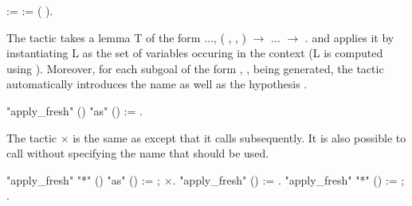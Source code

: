 \documentclass[12pt]{report}
\begin{document}
\begin{coqdoccode}
\coqdocemptyline
\coqdocnoindent
{}   :=\coqdoceol
\coqdocindent{1.00em}
  :=   (  ).\coqdoceol
\coqdocemptyline
\end{coqdoccode}
The tactic     takes a lemma T of the form 
    \coqdockw{\ensuremath{\forall}}  ..., (\coqdockw{\ensuremath{\forall}} ,   ,  ) \ensuremath{\rightarrow} ... \ensuremath{\rightarrow} .
    and applies it by instantiating L as the set of variables 
    occuring in the context (L is computed using ).
    Moreover, for each subgoal of the form \coqdockw{\ensuremath{\forall}} ,   ,  
    being generated, the tactic automatically introduces the name  
    as well as the hypothesis   .

\begin{coqdoccode}
\coqdocemptyline
\coqdocnoindent
{} "apply\_fresh" () "as" () :=\coqdoceol
\coqdocindent{1.00em}
   .\coqdoceol
\coqdocemptyline
\end{coqdoccode}
The tactic \ensuremath{\times}    is the same as 
        except that it calls  
    subsequently. It is also possible to call 
    without specifying the name that should be used.

\begin{coqdoccode}
\coqdocemptyline
\coqdocnoindent
{} "apply\_fresh" "*" () "as" () :=\coqdoceol
\coqdocindent{1.00em}
   ; \ensuremath{\times}.\coqdoceol
\coqdocnoindent
{} "apply\_fresh" () :=\coqdoceol
\coqdocindent{1.00em}
   .\coqdoceol
\coqdocnoindent
{} "apply\_fresh" "*" () :=\coqdoceol
\coqdocindent{1.00em}
 ; .\coqdoceol
\coqdocemptyline
\end{coqdoccode}
\end{document}
